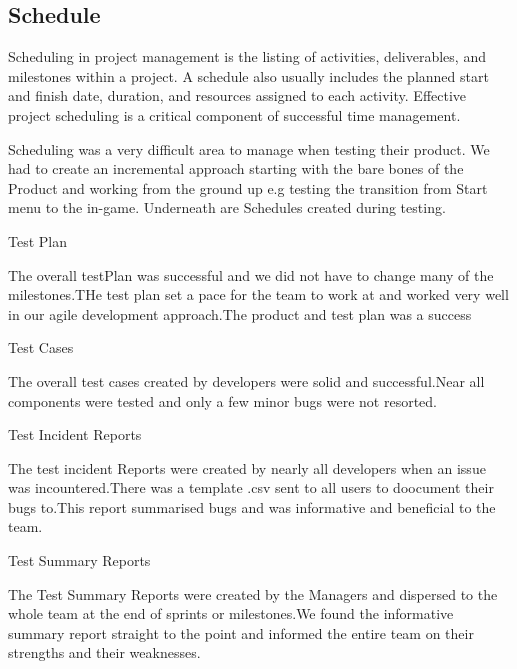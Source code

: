 \subsection{Schedule}

Scheduling in project management is the listing of activities, deliverables, and milestones within a project. A schedule also usually includes the planned start and finish date, duration, and resources assigned to each activity. Effective project scheduling is a critical component of successful time management.

Scheduling was a very difficult area to manage when testing their product. We had to create an
incremental approach starting with the bare bones of the Product and working from the ground up
e.g testing the transition from Start menu to the in-game. Underneath are Schedules created during
testing.	


\begin{center}
\centerline{Test Plan}
\end{center}
The overall testPlan was successful and we did not have to change many of the milestones.THe test plan set a pace for the team to work at and worked very well in our agile development approach.The product and test plan was a success



\begin{center}
\centerline{Test Cases}
\end{center}
The overall test cases created by developers were solid and successful.Near all components were tested and only a few minor bugs were not resorted.


\begin{center}
\centerline{Test Incident Reports}
\end{center}
The test incident Reports were created by nearly all developers when an issue was incountered.There was a template .csv sent to all users to doocument their bugs to.This report summarised bugs and was informative and beneficial to the team.



\begin{center}
\centerline{Test Summary Reports}
\end{center}
The Test Summary Reports were created by the Managers and dispersed to the whole team at the end of sprints or milestones.We found the informative summary report straight to the point and informed the entire team on their strengths and their weaknesses.
